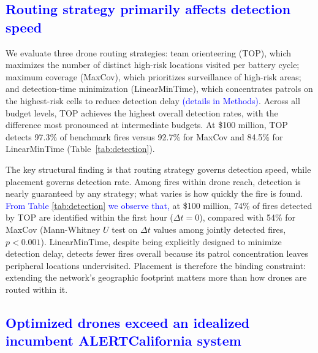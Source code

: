 \documentclass[pdflatex,sn-mathphys-num]{sn-jnl}%
\theoremstyle{thmstyleone}%
\theoremstyle{thmstyletwo}%
\theoremstyle{thmstylethree}%
\newcommand{\blue}[1]{\textcolor{blue}{#1}}
\begin{document}
\blue{\subsection*{Routing strategy primarily affects detection speed}}
We evaluate three drone routing strategies: team orienteering (TOP), which maximizes the number of distinct high-risk locations visited per battery cycle; maximum coverage (MaxCov), which prioritizes surveillance of high-risk areas; and detection-time minimization (LinearMinTime), which concentrates patrols on the highest-risk cells to reduce detection delay \blue{(details in Methods)}. Across all budget levels, TOP achieves the highest overall detection rates, with the difference most pronounced at intermediate budgets. At \$100 million, TOP detects 97.3\% of benchmark fires versus 92.7\% for MaxCov and 84.5\% for LinearMinTime (Table~\ref{tab:detection}).

The key structural finding is that routing strategy governs detection speed, while placement governs detection rate. Among fires within drone reach, detection is nearly guaranteed by any strategy; what varies is how quickly the fire is found. \blue{From Table \ref{tab:detection} we observe that,} at \$100 million, 74\% of fires detected by TOP are identified within the first hour ($\Delta t = 0$), compared with 54\% for MaxCov (Mann-Whitney $U$ test on $\Delta t$ values among jointly detected fires, $p < 0.001$). LinearMinTime, despite being explicitly designed to minimize detection delay, detects fewer fires overall because its patrol concentration leaves peripheral locations undervisited. Placement is therefore the binding constraint: extending the network's geographic footprint matters more than how drones are routed within it.

\blue{\subsection*{Optimized drones exceed an idealized incumbent ALERTCalifornia system}}
\end{document}
